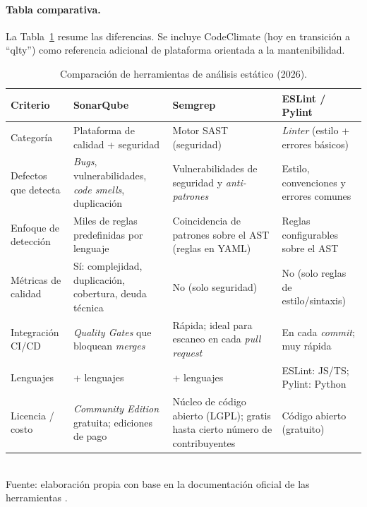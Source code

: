 \documentclass[12pt,a4paper]{article}
\begin{document}
\paragraph{Tabla comparativa.}
La Tabla~\ref{tab:static} resume las diferencias. Se incluye CodeClimate (hoy en
transición a ``qlty'') como referencia adicional de plataforma orientada a la
mantenibilidad.

\begin{table}[htbp]
\centering
\footnotesize
\caption{Comparación de herramientas de análisis estático (2026).}
\label{tab:static}
\renewcommand{\arraystretch}{1.25}
\begin{tabularx}{\textwidth}{>{\RaggedRight\arraybackslash}p{}
                             >{\RaggedRight\arraybackslash}X
                             >{\RaggedRight\arraybackslash}X
                             >{\RaggedRight\arraybackslash}X}
\toprule
\textbf{Criterio} & \textbf{SonarQube} & \textbf{Semgrep} & \textbf{ESLint / Pylint} \\
\midrule
Categoría &
Plataforma de calidad + seguridad &
Motor SAST (seguridad) &
\textit{Linter} (estilo + errores básicos) \\

Defectos que detecta &
\textit{Bugs}, vulnerabilidades, \textit{code smells}, duplicación &
Vulnerabilidades de seguridad y \textit{anti-patrones} &
Estilo, convenciones y errores comunes \\

Enfoque de detección &
Miles de reglas predefinidas por lenguaje &
Coincidencia de patrones sobre el AST (reglas en YAML) &
Reglas configurables sobre el AST \\

Métricas de calidad &
Sí: complejidad, duplicación, cobertura, deuda técnica &
No (solo seguridad) &
No (solo reglas de estilo/sintaxis) \\

Integración CI/CD &
\textit{Quality Gates} que bloquean \textit{merges} &
Rápida; ideal para escaneo en cada \textit{pull request} &
En cada \textit{commit}; muy rápida \\

Lenguajes &
30+ lenguajes &
35+ lenguajes &
ESLint: JS/TS; Pylint: Python \\

Licencia / costo &
\textit{Community Edition} gratuita; ediciones de pago &
Núcleo de código abierto (LGPL); gratis hasta cierto número de contribuyentes &
Código abierto (gratuito) \\
\bottomrule
\end{tabularx}
\\[2pt]
{\footnotesize Fuente: elaboración propia con base en la documentación oficial de las
herramientas \citep{sonarqubedocs}.}
\end{table}
\end{document}
